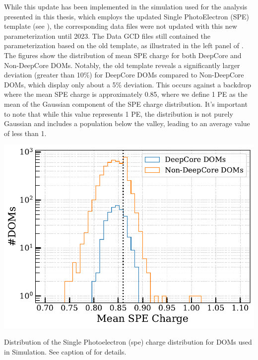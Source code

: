 While this update has been implemented in the simulation used for the analysis presented in this thesis, which employs the updated Single PhotoElectron (SPE) template (see ), the corresponding data files were not updated with this new parameterization until 2023. The Data GCD files still contained the parameterization based on the old template, as illustrated in the left panel of . The figures show the distribution of mean SPE charge for both DeepCore and Non-DeepCore DOMs. Notably, the old template reveals a significantly larger deviation (greater than 10\%) for DeepCore DOMs compared to Non-DeepCore DOMs, which display only about a 5\% deviation. This occurs against a backdrop where the mean SPE charge is approximately 0.85, where we define 1 PE as the mean of the Gaussian component of the SPE charge distribution. It’s important to note that while this value represents 1 PE, the distribution is not purely Gaussian and includes a population below the valley, leading to an average value of less than 1.
\begin{marginfigure}
    
    \includegraphics{./figures/results/Updated.pdf}


    \caption{Distribution of the Single Photoelectron (spe) charge distribution for DOMs used in Simulation. See caption of  for details.}
\end{marginfigure}

